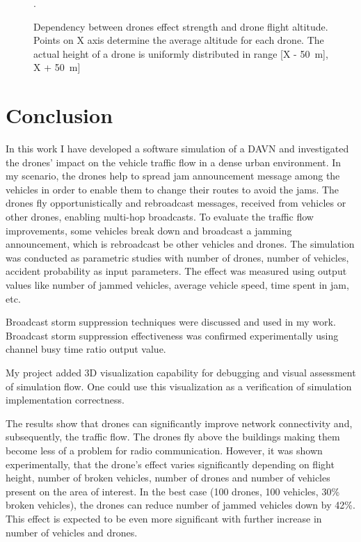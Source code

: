 \documentclass[]{nsm-thesis}
\begin{document}
\begin{figure}%
	\centering
	\hfill
	\hfill
	\caption{Dependency between drones effect strength and drone flight altitude. Points on X axis determine the average altitude for each drone. The actual height of a drone is uniformly distributed in range [X - \SI{50}{\meter}], X + \SI{50}{\meter}]}.%
	\label{fig:Evaluation-DroneHeight}%
\end{figure}


\chapter{Conclusion}

In this work I have developed a software simulation of a \ac{DAVN} and investigated the drones' impact on the vehicle traffic flow in a dense urban environment. In my scenario, the drones help to spread jam announcement message among the vehicles in order to enable them to change their routes to avoid the jams. The drones fly opportunistically and rebroadcast messages, received from vehicles or other drones, enabling multi-hop broadcasts. To evaluate the traffic flow improvements, some vehicles break down and broadcast a jamming announcement, which is rebroadcast be other vehicles and drones. The simulation was conducted as parametric studies with number of drones, number of vehicles, accident probability as input parameters. The effect was measured using output values like number of jammed vehicles, average vehicle speed, time spent in jam, etc.

Broadcast storm suppression techniques were discussed and used in my work. Broadcast storm suppression effectiveness was confirmed experimentally using channel busy time ratio output value.

My project added 3D visualization capability for debugging and visual assessment of simulation flow. One could use this visualization as a verification of simulation implementation correctness.

The results show that drones can significantly improve network connectivity and, subsequently, the traffic flow. The drones fly above the buildings making them become less of a problem for radio communication. However, it was shown experimentally, that the drone's effect varies significantly depending on flight height, number of broken vehicles, number of drones and number of vehicles present on the area of interest. In the best case (100 drones, 100 vehicles, 30\% broken vehicles), the drones can reduce number of jammed vehicles down by 42\%. This effect is expected to be even more significant with further increase in number of vehicles and drones.
\end{document}
